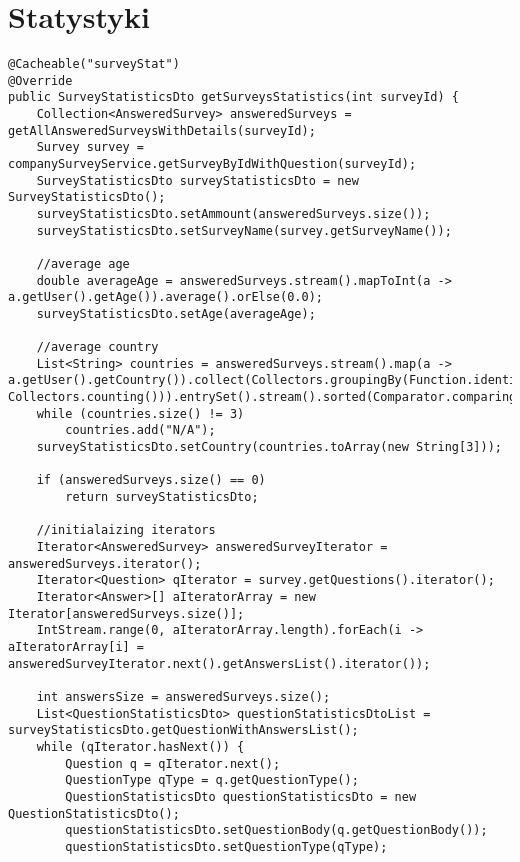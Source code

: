 \section{Statystyki}
\paragraph{}
\begin{lstlisting}[caption={Listing kodu pobierającego statystyki dla danej ankiety.},captionpos=b] 
@Cacheable("surveyStat")
@Override
public SurveyStatisticsDto getSurveysStatistics(int surveyId) {
	Collection<AnsweredSurvey> answeredSurveys = getAllAnsweredSurveysWithDetails(surveyId);
	Survey survey = companySurveyService.getSurveyByIdWithQuestion(surveyId);
	SurveyStatisticsDto surveyStatisticsDto = new SurveyStatisticsDto();
	surveyStatisticsDto.setAmmount(answeredSurveys.size());
	surveyStatisticsDto.setSurveyName(survey.getSurveyName());

	//average age
	double averageAge = answeredSurveys.stream().mapToInt(a -> a.getUser().getAge()).average().orElse(0.0);
	surveyStatisticsDto.setAge(averageAge);

	//average country
	List<String> countries = answeredSurveys.stream().map(a -> a.getUser().getCountry()).collect(Collectors.groupingBy(Function.identity(), Collectors.counting())).entrySet().stream().sorted(Comparator.comparingLong(Map.Entry::getValue)).limit(3).map(Map.Entry::getKey).collect(Collectors.toList());
	while (countries.size() != 3)
		countries.add("N/A");
	surveyStatisticsDto.setCountry(countries.toArray(new String[3]));
	
	if (answeredSurveys.size() == 0)
		return surveyStatisticsDto;

	//initialaizing iterators
	Iterator<AnsweredSurvey> answeredSurveyIterator = answeredSurveys.iterator();
	Iterator<Question> qIterator = survey.getQuestions().iterator();
	Iterator<Answer>[] aIteratorArray = new Iterator[answeredSurveys.size()];
	IntStream.range(0, aIteratorArray.length).forEach(i -> aIteratorArray[i] = answeredSurveyIterator.next().getAnswersList().iterator());

	int answersSize = answeredSurveys.size();
	List<QuestionStatisticsDto> questionStatisticsDtoList = surveyStatisticsDto.getQuestionWithAnswersList();
	while (qIterator.hasNext()) {
		Question q = qIterator.next();
		QuestionType qType = q.getQuestionType();
		QuestionStatisticsDto questionStatisticsDto = new QuestionStatisticsDto();
		questionStatisticsDto.setQuestionBody(q.getQuestionBody());
		questionStatisticsDto.setQuestionType(qType);


\end{lstlisting}

